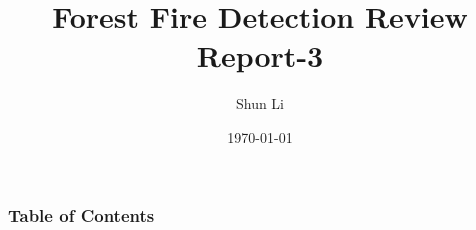 \documentclass[9pt]{beamer}
\title[Forest Fire Detection Review Report]
{Forest Fire Detection Review Report-3}
\author[Author, Shun Li] {Shun Li\inst{1}}
\institute[Concordia]{Concordia University}
\date {\today}
\begin{document}
\frame{\titlepage}
\begin{frame}
    \frametitle{Table of Contents}
    \tableofcontents
\end{frame}






\end{document}
